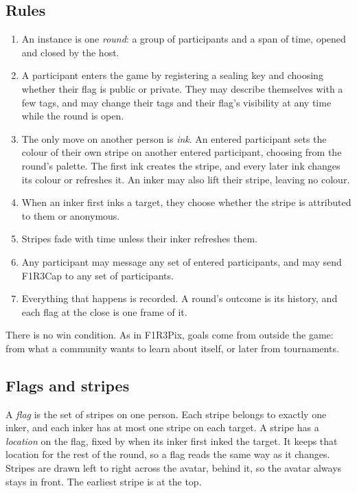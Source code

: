 \documentclass[11pt,a4paper]{article}
\begin{document}
\subsection{Rules}

\begin{enumerate}[leftmargin=1.4em,itemsep=3pt]
\item An instance is one \emph{round}: a group of participants and a span of time, opened and
  closed by the host.
\item A participant enters the game by registering a sealing key and choosing whether their flag
  is public or private. They may describe themselves with a few tags, and may change their tags
  and their flag's visibility at any time while the round is open.
\item The only move on another person is \emph{ink}. An entered participant sets the colour of
  their own stripe on another entered participant, choosing from the round's palette. The first
  ink creates the stripe, and every later ink changes its colour or refreshes it. An inker may
  also lift their stripe, leaving no colour.
\item When an inker first inks a target, they choose whether the stripe is attributed to them
  or anonymous.
\item Stripes fade with time unless their inker refreshes them.
\item Any participant may message any set of entered participants, and may send F1R3Cap to any
  set of participants.
\item Everything that happens is recorded. A round's outcome is its history, and each flag at
  the close is one frame of it.
\end{enumerate}

There is no win condition. As in F1R3Pix, goals come from outside the game: from what a
community wants to learn about itself, or later from tournaments.

\subsection{Flags and stripes}

A \emph{flag} is the set of stripes on one person. Each stripe belongs to exactly one inker, and
each inker has at most one stripe on each target. A stripe has a \emph{location} on the flag,
fixed by when its inker first inked the target. It keeps that location for the rest of the
round, so a flag reads the same way as it changes. Stripes are drawn left to right across the
avatar, behind it, so the avatar always stays in front. The earliest stripe is at the top.
\end{document}
